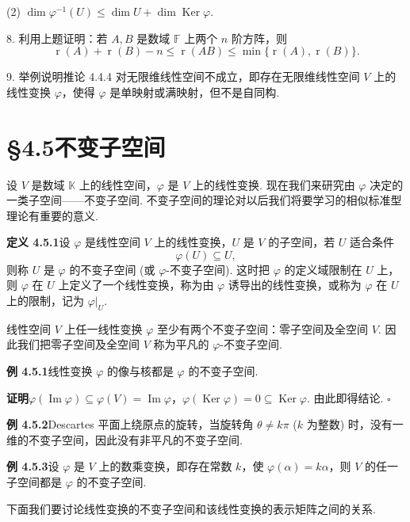 \documentclass[UTF8,12pt,a4paper,fontset=fandol]{ctexart}
\begin{document}
(2) $\dim\varphi^{-1}(U)\leq \dim U+\dim\operatorname{Ker}\varphi$.

8. 利用上题证明：若 $A,B$ 是数域 $\mathbb{F}$ 上两个 $n$ 阶方阵，则
\[
\operatorname{r}(A)+\operatorname{r}(B)-n\leq \operatorname{r}(AB)\leq \min\{\operatorname{r}(A),\operatorname{r}(B)\}.
\]

9. 举例说明推论 4.4.4 对无限维线性空间不成立，即存在无限维线性空间 $V$ 上的线性变换 $\varphi$，使得 $\varphi$ 是单映射或满映射，但不是自同构.

\section*{§4.5\quad 不变子空间}

设 $V$ 是数域 $\mathbb{K}$ 上的线性空间，$\varphi$ 是 $V$ 上的线性变换. 现在我们来研究由 $\varphi$ 决定的一类子空间——不变子空间. 不变子空间的理论对以后我们将要学习的相似标准型理论有重要的意义.

\noindent\textbf{定义 4.5.1}\quad 设 $\varphi$ 是线性空间 $V$ 上的线性变换，$U$ 是 $V$ 的子空间，若 $U$ 适合条件
\[
\varphi(U)\subseteq U,
\]
则称 $U$ 是 $\varphi$ 的不变子空间 (或 $\varphi$-不变子空间). 这时把 $\varphi$ 的定义域限制在 $U$ 上，则 $\varphi$ 在 $U$ 上定义了一个线性变换，称为由 $\varphi$ 诱导出的线性变换，或称为 $\varphi$ 在 $U$ 上的限制，记为 $\varphi|_U$.

线性空间 $V$ 上任一线性变换 $\varphi$ 至少有两个不变子空间：零子空间及全空间 $V$. 因此我们把零子空间及全空间 $V$ 称为平凡的 $\varphi$-不变子空间.

\noindent\textbf{例 4.5.1}\quad 线性变换 $\varphi$ 的像与核都是 $\varphi$ 的不变子空间.

\noindent\textbf{证明}\quad $\varphi(\operatorname{Im}\varphi)\subseteq\varphi(V)=\operatorname{Im}\varphi$，$\varphi(\operatorname{Ker}\varphi)=0\subseteq\operatorname{Ker}\varphi$. 由此即得结论. $\square$

\noindent\textbf{例 4.5.2}\quad Descartes 平面上绕原点的旋转，当旋转角 $\theta\neq k\pi$ ($k$ 为整数) 时，没有一维的不变子空间，因此没有非平凡的不变子空间.

\noindent\textbf{例 4.5.3}\quad 设 $\varphi$ 是 $V$ 上的数乘变换，即存在常数 $k$，使 $\varphi(\alpha)=k\alpha$，则 $V$ 的任一子空间都是 $\varphi$ 的不变子空间.

下面我们要讨论线性变换的不变子空间和该线性变换的表示矩阵之间的关系.
\end{document}
